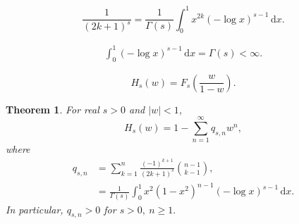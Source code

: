 \documentclass[10pt,a4paper]{amsart}
\newtheorem{theorem}{Theorem}
\newcommand{\dd}{\,\mathrm{d}}
\begin{document}
\begin{equation}\label{eq:moment}
 \frac1{(2k+1)^s}
 =
 \frac1{\Gamma(s)}
 \int_0^1x^{2k}(-\log x)^{s-1}\dd x.
\end{equation}

\begin{align}\label{eq-gamma}
    \int_0^1(-\log x)^{s-1}\dd x=\Gamma(s)<\infty.
\end{align}

\begin{equation}\label{eq:H-definition}
 H_s(w)=F_s\!\left(\frac{w}{1-w}\right).
\end{equation}

\begin{theorem}\label{thm:H-coefficients}
For real \(s>0\) and \(|w|<1\),
\begin{equation}\label{eq:H-expansion}
 H_s(w)=1-\sum_{n=1}^{\infty}q_{s,n}w^n,
\end{equation}
where
\begin{align}
 q_{s,n}
 &=
 \sum_{k=1}^{n}
 \frac{(-1)^{k+1}}{(2k+1)^s}
 \binom{n-1}{k-1},                       \label{eq:q-finite}\\
 &=
 \frac1{\Gamma(s)}
 \int_0^1
 x^2(1-x^2)^{n-1}
 (-\log x)^{s-1}\dd x.                 \label{eq:q-integral}
\end{align}
In particular,
\(
 q_{s,n}>0
 \) for \(s>0,\ n\geq1.
\)
\end{theorem}
\end{document}
